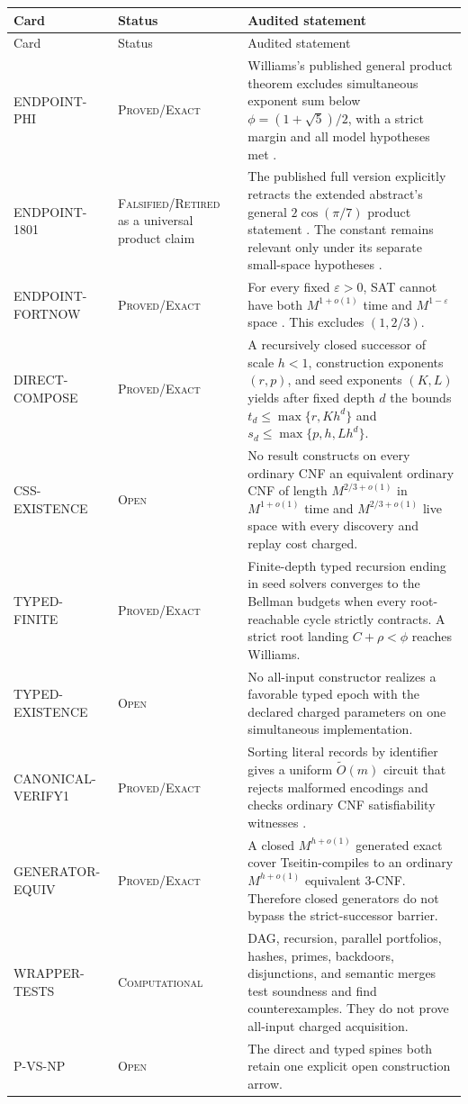 \documentclass[11pt]{article}
\newcommand{\Exact}{\textsc{Proved/Exact}}
\newcommand{\Comp}{\textsc{Computational}}
\newcommand{\Open}{\textsc{Open}}
\newcommand{\Retired}{\textsc{Falsified/}\allowbreak\textsc{Retired}}
\begin{document}
{\small
\begin{longtable}{L{0.19\textwidth}L{0.16\textwidth}L{0.57\textwidth}}
\toprule
Card & Status & Audited statement \\
\midrule
\endfirsthead
\toprule
Card & Status & Audited statement \\
\midrule
\endhead
\bottomrule
\endfoot
ENDPOINT-PHI & \Exact{} & Williams's published general product theorem
excludes simultaneous exponent sum below
$\phi=(1+\sqrt5)/2$, with a strict margin and all model hypotheses met
\cite[Theorem~4.11]{williams2010}. \\
ENDPOINT-1801 & \Retired{} as a universal product claim & The published full
version explicitly retracts the extended abstract's general
$2\cos(\pi/7)$ product statement
\cite[Section~4.5, footnote~9]{williams2010}.  The constant remains relevant
only under its separate small-space hypotheses
\cite{williams2008mod,busswilliams2015}. \\
ENDPOINT-FORTNOW & \Exact{} & For every fixed $\varepsilon>0$, SAT cannot
have both $M^{1+o(1)}$ time and $M^{1-\varepsilon}$ space
\cite{fortnow2000}.  This excludes $(1,2/3)$. \\
DIRECT-COMPOSE & \Exact{} & A recursively closed successor of scale $h<1$,
construction exponents $(r,p)$, and seed exponents $(K,L)$ yields after fixed
depth $d$ the bounds
$t_d\le\max\{r,Kh^d\}$ and
$s_d\le\max\{p,h,Lh^d\}$. \\
CSS-EXISTENCE & \Open{} & No result constructs on every ordinary CNF an
equivalent ordinary CNF of length $M^{2/3+o(1)}$ in $M^{1+o(1)}$ time and
$M^{2/3+o(1)}$ live space with every discovery and replay cost charged. \\
TYPED-FINITE & \Exact{} & Finite-depth typed recursion ending in seed
solvers converges to the Bellman budgets when every root-reachable cycle
strictly contracts.  A strict root landing $C+\rho<\phi$ reaches Williams. \\
TYPED-EXISTENCE & \Open{} & No all-input constructor realizes a favorable
typed epoch with the declared charged parameters on one simultaneous
implementation. \\
CANONICAL-VERIFY1 & \Exact{} & Sorting literal records by identifier gives a
uniform $\widetilde O(m)$ circuit that rejects malformed encodings and checks
ordinary CNF satisfiability witnesses \cite{batcher1968sorting}. \\
GENERATOR-EQUIV & \Exact{} & A closed $M^{h+o(1)}$ generated exact cover
Tseitin-compiles to an ordinary $M^{h+o(1)}$ equivalent 3-CNF.  Therefore
closed generators do not bypass the strict-successor barrier. \\
WRAPPER-TESTS & \Comp{} & DAG, recursion, parallel portfolios, hashes,
primes, backdoors, disjunctions, and semantic merges test soundness and find
counterexamples.  They do not prove all-input charged acquisition. \\
P-VS-NP & \Open{} & The direct and typed spines both retain one explicit
open construction arrow. \\
\end{longtable}
}
\end{document}
